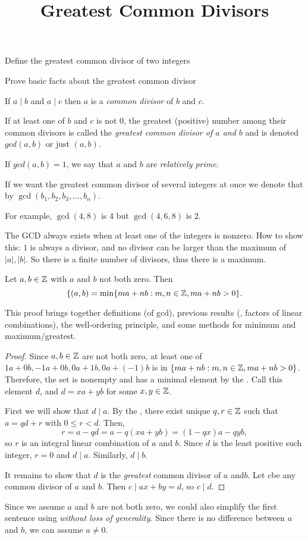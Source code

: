 \documentclass{../ximera}
\title{Greatest Common Divisors}
\begin{document}
\begin{abstract}
\end{abstract}
\maketitle


\begin{obj}
\item Define the greatest common divisor of two integers
\item Prove basic facts about the greatest common divisor
\end{obj}


\begin{defn}\label{defn:gcd} 
  If $a\mid b$ and $a\mid c$ then $a$ is a \emph{common divisor} of $b$ and $c$.

  If at least one of $b$ and $c$ is not $0$, the greatest (positive) number among their common divisors  is called the \emph{greatest common divisor of $a$ and $b$} and is denoted $gcd(a,b)$ or just $(a,b)$. 
 
  If $gcd(a,b)=1$, we say that $a$ and $b$ are \emph{relatively prime}.

  If we want the greatest common divisor of several integers at once we denote that by $\gcd(b_1,b_2,b_3,\dots,b_n)$.
\end{defn}

For example, $\gcd(4,8)$ is $4$ but $\gcd(4,6,8)$ is $2$.

The GCD always exists when at least one of the integers is nonzero. How to show this: $1$ is always a divisor, and no divisor can be larger than the maximum of $|a|,|b|$. So there is a finite number of divisors, thus there is a maximum.


\begin{prop*}\label{Bezout}
  Let $a, b\in \mathbb Z$ with $a$ and $b$ not both zero. Then 
    \[\{(a,b)=\min\{ma+nb:m,n\in\mathbb Z, ma+nb>0\}.\]
\end{prop*}
This proof brings together definitions (of gcd), previous results (, factors of linear combinations), the well-ordering principle, and some methods for minimum and maximum/greatest.

\begin{proof}
  Since $a,b\in\mathbb Z$ are not both zero, at least one of $1a+0b, -1a+0b, 0a+1b, 0a+(-1)b$ is in $\{ma+nb:m,n\in\mathbb Z, ma+nb>0\}$. Therefore, the set is nonempty and has a minimal element by the . Call this element $d$, and $d=xa+yb$ for some $x,y\in \mathbb Z$.
 
  First we will show that $d\mid a$. By the , there exist unique $q,r\in\mathbb Z$ such that $a=qd+r$ with $0\leq r<d$. Then, \[r=a-qd=a-q(xa+yb)=(1-qx)a-qyb,\] so $r$ is an integral linear combination of $a$ and $b$.  Since $d$ is the least positive such integer, $r=0$ and $d\mid a$. Similarly, $d\mid b$. 

  It remains to show that $d$ is the \emph{greatest} common divisor of $a$ and$b$. Let $c$be any common divisor of $a$  and $b$. Then $c\mid ax+by=d$, so $c\mid d$.
\end{proof}

Since we assume $a$ and $b$ are not both zero, we could also simplify the first sentence using \emph{without loss of generality}. Since there is no difference between $a$ and $b$, we can assume $a\neq0$.

\end{document}
